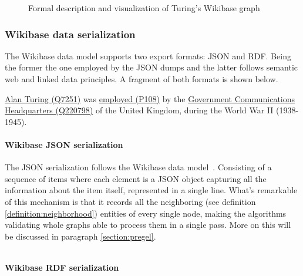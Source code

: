 

\begin{figure}[H]
    \centering
    
    \caption[Formal description and visualization of Turing's Wikibase graph]{Formal description and visualization of Turing's Wikibase graph}
\end{figure}

\subsubsection{Wikibase data serialization}
\label{section:wikibase:serialization}

The Wikibase data model supports two export formats: JSON and RDF. Being the former the one employed by the JSON dumps and the latter follows semantic web and linked data principles. A fragment of both formats is shown below.

\begin{example}
    \href{https://www.wikidata.org/wiki/Q7251}{Alan Turing (Q7251)} was \href{https://www.wikidata.org/wiki/Property:P108}{employed (P108)} by the \href{https://www.wikidata.org/wiki/Q220798}{Government Communications Headquarters (Q220798)} of the United Kingdom, during the World War II (1938-1945).
\end{example}

\paragraph{Wikibase JSON serialization}

The JSON serialization follows the Wikibase data model~\cite{https://doi.org/10.48550/arxiv.2110.11709}. Consisting of a sequence of items where each element is a JSON object capturing all the information about the item itself, represented in a single line. What's remarkable of this mechanism is that it records all the neighboring (see definition \ref{definition:neighborhood}) entities of every single node, making the algorithms validating whole graphs able to process them in a single pass. More on this will be discussed in paragraph \ref{section:pregel}.

\inputminted{json}{listings/serialization.json}

\paragraph[Wikibase RDF serialization]{Wikibase RDF serialization\footnotemark}

